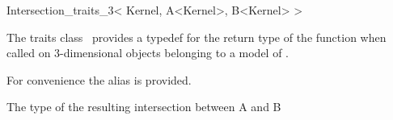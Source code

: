 \begin{ccRefClass}{Intersection_traits_3< Kernel, A<Kernel>, B<Kernel> >}


\ccDefinition

The traits class \ccClassTemplateName\ provides a typedef for the
return type of the  function when called on
3-dimensional objects belonging to a model of .

For convenience the alias  is provided.

\ccTypes

 The type of the resulting intersection between A and B
\end{ccRefClass}

